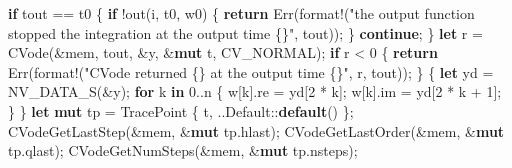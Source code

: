 \documentclass[
  10pt,
]{article}
\newenvironment{Shaded}{}{}
\newcommand{\BuiltInTok}[1]{\textcolor[rgb]{0.00,0.50,0.00}{#1}}
\newcommand{\ConstantTok}[1]{\textcolor[rgb]{0.53,0.00,0.00}{#1}}
\newcommand{\ControlFlowTok}[1]{\textcolor[rgb]{0.00,0.44,0.13}{\textbf{#1}}}
\newcommand{\DecValTok}[1]{\textcolor[rgb]{0.25,0.63,0.44}{#1}}
\newcommand{\KeywordTok}[1]{\textcolor[rgb]{0.00,0.44,0.13}{\textbf{#1}}}
\newcommand{\NormalTok}[1]{#1}
\newcommand{\OperatorTok}[1]{\textcolor[rgb]{0.40,0.40,0.40}{#1}}
\newcommand{\PreprocessorTok}[1]{\textcolor[rgb]{0.74,0.48,0.00}{#1}}
\newcommand{\StringTok}[1]{\textcolor[rgb]{0.25,0.44,0.63}{#1}}
\begin{document}
\begin{Shaded}
\begin{Highlighting}[]
        \ControlFlowTok{if}\NormalTok{ tout }\OperatorTok{==}\NormalTok{ t0 }\OperatorTok{\{}
            \ControlFlowTok{if} \OperatorTok{!}\NormalTok{out(i}\OperatorTok{,}\NormalTok{ t0}\OperatorTok{,}\NormalTok{ w0) }\OperatorTok{\{}
                \ControlFlowTok{return} \ConstantTok{Err}\NormalTok{(}\PreprocessorTok{format!}\NormalTok{(}\StringTok{"the output function stopped the integration at the output time \{\}"}\OperatorTok{,}\NormalTok{ tout))}\OperatorTok{;}
            \OperatorTok{\}}
            \ControlFlowTok{continue}\OperatorTok{;}
        \OperatorTok{\}}
        \KeywordTok{let}\NormalTok{ r }\OperatorTok{=}\NormalTok{ CVode(}\OperatorTok{\&}\NormalTok{mem}\OperatorTok{,}\NormalTok{ tout}\OperatorTok{,} \OperatorTok{\&}\NormalTok{y}\OperatorTok{,} \OperatorTok{\&}\KeywordTok{mut}\NormalTok{ t}\OperatorTok{,}\NormalTok{ CV\_NORMAL)}\OperatorTok{;}
        \ControlFlowTok{if}\NormalTok{ r }\OperatorTok{\textless{}} \DecValTok{0} \OperatorTok{\{}
            \ControlFlowTok{return} \ConstantTok{Err}\NormalTok{(}\PreprocessorTok{format!}\NormalTok{(}\StringTok{"CVode returned \{\} at the output time \{\}"}\OperatorTok{,}\NormalTok{ r}\OperatorTok{,}\NormalTok{ tout))}\OperatorTok{;}
        \OperatorTok{\}}
        \OperatorTok{\{}
            \KeywordTok{let}\NormalTok{ yd }\OperatorTok{=}\NormalTok{ NV\_DATA\_S(}\OperatorTok{\&}\NormalTok{y)}\OperatorTok{;}
            \ControlFlowTok{for}\NormalTok{ k }\KeywordTok{in} \DecValTok{0}\OperatorTok{..}\NormalTok{n }\OperatorTok{\{}
\NormalTok{                w[k]}\OperatorTok{.}\NormalTok{re }\OperatorTok{=}\NormalTok{ yd[}\DecValTok{2} \OperatorTok{*}\NormalTok{ k]}\OperatorTok{;}
\NormalTok{                w[k]}\OperatorTok{.}\NormalTok{im }\OperatorTok{=}\NormalTok{ yd[}\DecValTok{2} \OperatorTok{*}\NormalTok{ k }\OperatorTok{+} \DecValTok{1}\NormalTok{]}\OperatorTok{;}
            \OperatorTok{\}}
        \OperatorTok{\}}
        \KeywordTok{let} \KeywordTok{mut}\NormalTok{ tp }\OperatorTok{=}\NormalTok{ TracePoint }\OperatorTok{\{}\NormalTok{ t}\OperatorTok{,} \OperatorTok{..}\BuiltInTok{Default}\PreprocessorTok{::}\KeywordTok{default}\NormalTok{() }\OperatorTok{\};}
\NormalTok{        CVodeGetLastStep(}\OperatorTok{\&}\NormalTok{mem}\OperatorTok{,} \OperatorTok{\&}\KeywordTok{mut}\NormalTok{ tp}\OperatorTok{.}\NormalTok{hlast)}\OperatorTok{;}
\NormalTok{        CVodeGetLastOrder(}\OperatorTok{\&}\NormalTok{mem}\OperatorTok{,} \OperatorTok{\&}\KeywordTok{mut}\NormalTok{ tp}\OperatorTok{.}\NormalTok{qlast)}\OperatorTok{;}
\NormalTok{        CVodeGetNumSteps(}\OperatorTok{\&}\NormalTok{mem}\OperatorTok{,} \OperatorTok{\&}\KeywordTok{mut}\NormalTok{ tp}\OperatorTok{.}\NormalTok{nsteps)}\OperatorTok{;}

\end{Highlighting}
\end{Shaded}
\end{document}

